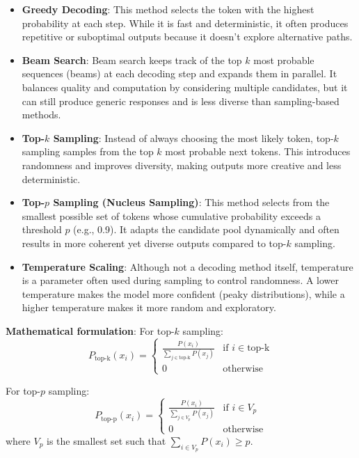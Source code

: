 \begin{itemize}
	\item \textbf{Greedy Decoding}: This method selects the token with the highest probability at each step. While it is fast and deterministic, it often produces repetitive or suboptimal outputs because it doesn't explore alternative paths.
	\item \textbf{Beam Search}: Beam search keeps track of the top \(k\) most probable sequences (beams) at each decoding step and expands them in parallel. It balances quality and computation by considering multiple candidates, but it can still produce generic responses and is less diverse than sampling-based methods.
	\item \textbf{Top-\(k\) Sampling}: Instead of always choosing the most likely token, top-\(k\) sampling samples from the top \(k\) most probable next tokens. This introduces randomness and improves diversity, making outputs more creative and less deterministic.
	\item \textbf{Top-\(p\) Sampling (Nucleus Sampling)}: This method selects from the smallest possible set of tokens whose cumulative probability exceeds a threshold \(p\) (e.g., 0.9). It adapts the candidate pool dynamically and often results in more coherent yet diverse outputs compared to top-\(k\) sampling.
	\item \textbf{Temperature Scaling}: Although not a decoding method itself, temperature is a parameter often used during sampling to control randomness. A lower temperature makes the model more confident (peaky distributions), while a higher temperature makes it more random and exploratory.
\end{itemize}

\textbf{Mathematical formulation}:
For top-\(k\) sampling:
\[
	P_{\text{top-k}}(x_i) = \begin{cases}
		\frac{P(x_i)}{\sum_{j \in \text{top-k}} P(x_j)} & \text{if } i \in \text{top-k} \\
		0                                               & \text{otherwise}
	\end{cases}
\]

For top-\(p\) sampling:
\[
	P_{\text{top-p}}(x_i) = \begin{cases}
		\frac{P(x_i)}{\sum_{j \in V_p} P(x_j)} & \text{if } i \in V_p \\
		0                                      & \text{otherwise}
	\end{cases}
\]
where \(V_p\) is the smallest set such that \(\sum_{i \in V_p} P(x_i) \geq p\).

